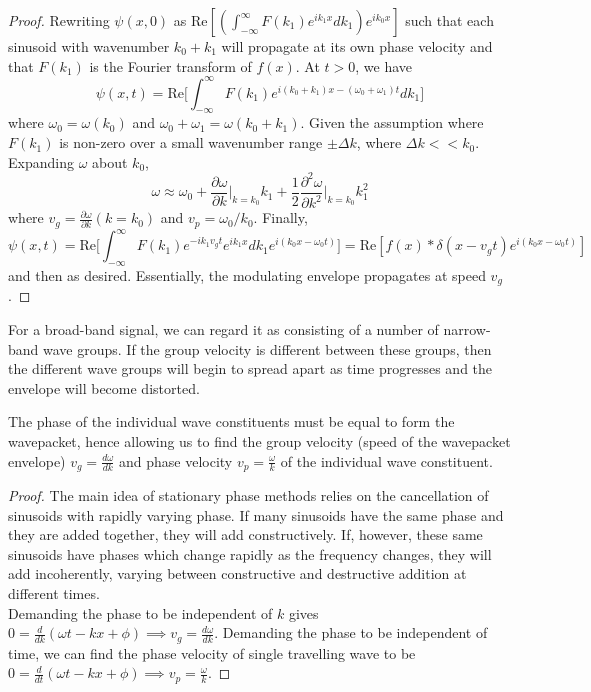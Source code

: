 \documentclass[a4paper]{article}
\begin{document}
\begin{proof}
Rewriting $\psi(x,0)$ as $\text{Re}[(\int_{-\infty}^\infty F(k_1)e^{ik_1x}dk_1)e^{ik_0x}]$ such that each sinusoid with wavenumber $k_0+k_1$ will propagate at its own phase velocity and that $F(k_1)$ is the Fourier transform of $f(x)$. At $t>0$, we have
$$\psi(x,t)=\text{Re}\bigg[\int_{-\infty}^\infty F(k_1)e^{i(k_0+k_1)x-(\omega_0+\omega_1)t}dk_1\bigg]$$
where $\omega_0=\omega(k_0)$ and $\omega_0+\omega_1=\omega(k_0+k_1)$. Given the assumption where $F(k_1)$ is non-zero over a small wavenumber range $\pm\Delta k$, where $\Delta k<<k_0$. Expanding $\omega$ about $k_0$,
$$\omega\approx\omega_0+\frac{\partial\omega}{\partial k}\bigg|_{k=k_0}k_1+\frac{1}{2}\frac{\partial^2\omega}{\partial k^2}\bigg|_{k=k_0}k_1^2$$
where $v_g=\frac{\partial\omega}{\partial k}(k=k_0)$ and $v_p=\omega_0/k_0$. Finally,
$$\psi(x,t)=\text{Re}\bigg[\int_{-\infty}^\infty F(k_1)e^{-ik_1v_gt}e^{ik_1x}dk_1e^{i(k_0x-\omega_0t)}\bigg]=\text{Re}[f(x)*\delta(x-v_gt)e^{i(k_0x-\omega_0t)}]$$
and then as desired. Essentially, the modulating envelope propagates at speed $v_g$.
\end{proof}
For a broad-band signal, we can regard it as consisting of a number of narrow-band wave groups. If the group velocity is different between these groups, then the different wave groups will begin to spread apart as time progresses and the envelope will become distorted.
\begin{thm}
The phase of the individual wave constituents must be equal to form the wavepacket, hence allowing us to find the group velocity (speed of the wavepacket envelope) $v_g=\frac{d\omega}{dk}$ and phase velocity $v_p=\frac{\omega}{k}$ of the individual wave constituent.
\end{thm}
\begin{proof}
The main idea of stationary phase methods relies on the cancellation of sinusoids with rapidly varying phase. If many sinusoids have the same phase and they are added together, they will add constructively. If, however, these same sinusoids have phases which change rapidly as the frequency changes, they will add incoherently, varying between constructive and destructive addition at different times.\\[5pt]
Demanding the phase to be independent of $k$ gives $0=\frac{d}{dk}(\omega t-kx+\phi)\implies v_g=\frac{d\omega}{dk}$. Demanding the phase to be independent of time, we can find the phase velocity of single travelling wave to be $0=\frac{d}{dt}(\omega t-kx+\phi)\implies v_p=\frac{\omega}{k}$.
\end{proof}
\end{document}

